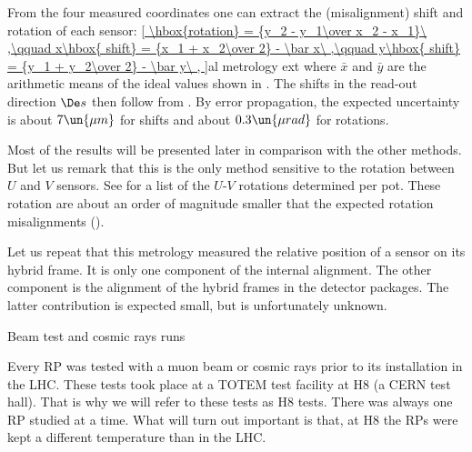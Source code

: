 
From the four measured coordinates one can extract the (misalignment) shift and rotation of each sensor:
\eqref{
	\hbox{rotation} = {y_2 - y_1\over x_2 - x_1}\ ,\qquad
	x\hbox{ shift} = {x_1 + x_2\over 2} - \bar x\ ,\qquad
	y\hbox{ shift} = {y_1 + y_2\over 2} - \bar y\ ,
}{al metrology ext}
where $\bar x$ and $\bar y$ are the arithmetic means of the ideal values shown in . The shifts in the read-out direction $\De s$ then follow from . By error propagation, the expected uncertainty is about $7\un{\mu m}$ for shifts and about $0.3\un{\mu rad}$ for rotations.

Most of the results will be presented later in comparison with the other methods. But let us remark that this is the only method sensitive to the rotation between $U$ and $V$ sensors. See  for a list of the $U$-$V$ rotations determined per pot. These rotation are about an order of magnitude smaller that the expected rotation misalignments ().


Let us repeat that this metrology measured the relative position of a sensor on its hybrid frame. It is only one component of the internal alignment. The other component is the alignment of the hybrid frames in the detector packages. The latter contribution is expected small, but is unfortunately unknown.

\caption{Beam test and cosmic rays runs}

Every RP was tested with a muon beam or cosmic rays prior to its installation in the LHC. These tests took place at a TOTEM test facility at H8 (a CERN test hall). That is why we will refer to these tests as H8 tests. There was always one RP studied at a time. What will turn out important is that, at H8 the RPs were kept a different temperature than in the LHC.

